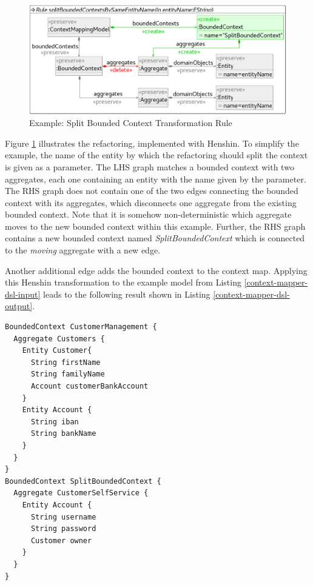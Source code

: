 \documentclass[runningheads]{llncs}
\begin{document}
\begin{figure}[H]
	\centering
	\includegraphics[width=1.0\textwidth]{ContextMapRefactoring_Example}
	\caption{Example: Split Bounded Context Transformation Rule}
	\label{fig:context-map-refactoring-henshin}
\end{figure}

\noindent
Figure \ref{fig:context-map-refactoring-henshin} illustrates the refactoring, implemented with Henshin. To simplify the example, the name of the entity by which the refactoring should split the context is given as a parameter. The LHS graph matches a bounded context with two aggregates, each one containing an entity with the name given by the parameter. The RHS graph does not contain one of the two edges connecting the bounded context with its aggregates, which disconnects one aggregate from the existing bounded context. Note that it is somehow non-deterministic which aggregate moves to the new bounded context within this example. Further, the RHS graph contains a new bounded context named \textit{SplitBoundedContext} which is connected to the \textit{moving} aggregate with a new edge.

Another additional edge adds the bounded context to the context map. Applying this Henshin transformation to the example model from Listing \ref{context-mapper-dsl-input} leads to the following result shown in Listing \ref{context-mapper-dsl-output}.

\begin{lstlisting}
BoundedContext CustomerManagement {
  Aggregate Customers {
    Entity Customer{
      String firstName
      String familyName
      Account customerBankAccount
    }
    Entity Account {
      String iban
      String bankName
    }
  } 
}
BoundedContext SplitBoundedContext {
  Aggregate CustomerSelfService {
    Entity Account {
      String username
      String password
      Customer owner
    }
  }
}
\end{lstlisting}
\end{document}
